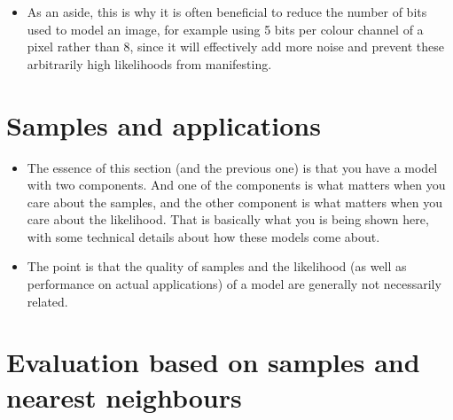 \documentclass{article}
\begin{document}
\begin{itemize}
\begin{itemize}
		\begin{itemize}
			\item As an aside, this is why it is often beneficial to reduce the number of bits used to model an image, for example using 5 bits per colour channel of a pixel rather than 8, since it will effectively add more noise and prevent these arbitrarily high likelihoods from manifesting.
		\end{itemize}
	\end{itemize}
\end{itemize}

\section{Samples and applications}

\begin{itemize}
	\item The essence of this section (and the previous one) is that you have a model with two components. And one of the components is what matters when you care about the samples, and the other component is what matters when you care about the likelihood. That is basically what you is being shown here, with some technical details about how these models come about. 
	
	\item The point is that the quality of samples and the likelihood (as well as performance on actual applications) of a model are generally not necessarily related.
\end{itemize}

\section{Evaluation based on samples and nearest neighbours}
\end{document}
